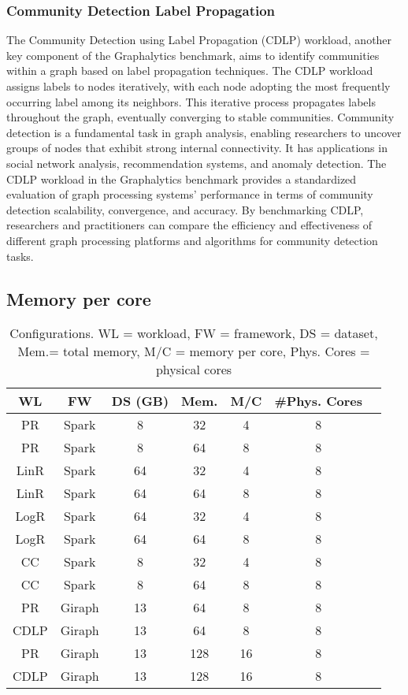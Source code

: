 \subsubsection{Community Detection Label Propagation}
The Community Detection using Label Propagation (CDLP) workload, another key component of the Graphalytics benchmark, aims to identify communities within a graph based on label propagation techniques. The CDLP workload assigns labels to nodes iteratively, with each node adopting the most frequently occurring label among its neighbors. This iterative process propagates labels throughout the graph, eventually converging to stable communities. Community detection is a fundamental task in graph analysis, enabling researchers to uncover groups of nodes that exhibit strong internal connectivity. It has applications in social network analysis, recommendation systems, and anomaly detection. The CDLP workload in the Graphalytics benchmark provides a standardized evaluation of graph processing systems' performance in terms of community detection scalability, convergence, and accuracy. By benchmarking CDLP, researchers and practitioners can compare the efficiency and effectiveness of different graph processing platforms and algorithms for community detection tasks.

\subsection{Memory per core}

\begin{table}[thbp]
  \centering
  \caption{Configurations. WL = workload, FW = framework, DS = dataset, Mem.= total memory, M/C = memory per core, Phys. Cores = physical cores}
  \label{tab:setups}
  \begin{tabular}{|c|c|c|c|c|c|c|}
    \hline
	  \textbf{WL} & \textbf{FW} & \textbf{DS (GB)} & \textbf{Mem.} & \textbf{M/C} & \textbf{\#Phys. Cores}\\
    \hline
	  PR & Spark & 8 & 32 & 4 & 8 \\
	  PR & Spark & 8 & 64 & 8 & 8 \\
	  LinR & Spark & 64 & 32 & 4 & 8 \\
	  LinR & Spark & 64 & 64 & 8 & 8 \\
	  LogR & Spark & 64 & 32 & 4 & 8 \\
	  LogR & Spark & 64 & 64 & 8 & 8 \\
	  CC & Spark & 8 & 32 & 4 & 8 \\
	  CC & Spark & 8 & 64 & 8 & 8 \\
	  PR & Giraph & 13 & 64 & 8 & 8 \\
	  CDLP & Giraph & 13 & 64 & 8 & 8 \\
	  PR & Giraph & 13 & 128 & 16 & 8 \\
	  CDLP & Giraph & 13 & 128 & 16 & 8 \\
    \hline
  \end{tabular}
\end{table}


